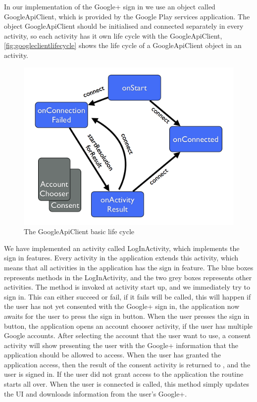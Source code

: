 In our implementation of the Google+ sign in we use an object called \\GoogleApiClient\citep{googleapiclient-docs}, which is provided by the Google Play services application. 
The object GoogleApiClient should be initialised and connected separately in every activity, so each activity has it own life cycle with the GoogleApiClient, \autoref{fig:googleclientlifecycle} shows the life cycle of a GoogleApiClient object in an activity.
\begin{figure}[H]
\centering
\includegraphics[width=0.75\linewidth]{img/googleclientflow.png}
\caption{The GoogleApiClient basic life cycle\cite{googleapiclient-lifecycle}}
\label{fig:googleclientlifecycle}
\end{figure}
We have implemented an activity called LogInActivity, which implements the sign in features. Every activity in the application extends this activity, which means that all activities in the application has the sign in feature. 
The blue boxes represents methods in the LogInActivity, and the two grey boxes represents other activities. The method  is invoked at activity start up, and we immediately try to sign in. 
This can either succeed or fail, if it fails  will be called, this will happen if the user has not yet consented with the Google+ sign in, the application now awaits for the user to press the sign in button. 
When the user presses the sign in button, the application opens an account chooser activity, if the user has multiple Google accounts. 
After selecting the account that the user want to use, a consent activity will show presenting the user with the Google+ information that the application should be allowed to access. 
When the user has granted the application access, then the result of the consent activity is returned to , and the user is signed in. 
If the user did not grant access to the application the routine starts all over. When the user is connected  is called, this method simply updates the UI and downloads information from the user's Google+. 

